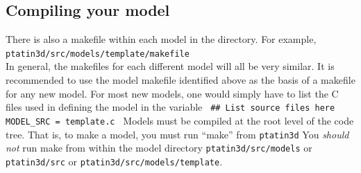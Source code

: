 \documentclass[paper=a4, fontsize=11pt,twoside]{scrartcl}
\newcommand{\shellcmd}[1]{\\\indent\indent\texttt{\hspace{5mm}\footnotesize #1}\\}
\newcommand{\unix}[1]{\texttt{\footnotesize #1}}
\begin{document}
{{\subsection{Compiling your model}
There is also a makefile within each model in the directory.
For example,
	\shellcmd{ptatin3d/src/models/template/makefile}
In general, the makefiles for each different model will all be very similar.
It is recommended to use the model makefile identified above as the basis of a makefile for any new model.
For most new models, one would simply have to list the C files used in defining the model in the variable
\newline
\unix{
\#\# List source files here \newline
MODEL\_SRC = \newline
        template.c \newline
}
Models must be compiled at the root level of the code tree.
That is, to make a model, you must run ``make'' from 
	\unix{ptatin3d}
You \textit{should not} run make from within the model directory
	\unix{ptatin3d/src/models}
or
	\unix{ptatin3d/src}
or
	\unix{ptatin3d/src/models/template}.

}}
\end{document}

